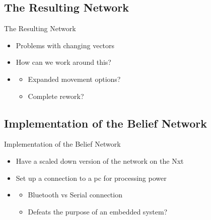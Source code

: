\subsection{The Resulting Network}
\begin{frame}{The Resulting Network}
\begin{itemize}
\item Problems with changing vectors
\item How can we work around this?
\item \begin{itemize}
  \item Expanded movement options?
  \item Complete rework?
  \end{itemize}
\end{itemize}
\end{frame}


\subsection{Implementation of the Belief Network}
\begin{frame}{Implementation of the Belief Network}
\begin{itemize}
\item Have a scaled down version of the network on the Nxt
\item Set up a connection to a pc for processing power
\item \begin{itemize}
   \item Bluetooth vs Serial connection
   \item Defeats the purpose of an embedded system?
   \end{itemize}
\end{itemize}
\end{frame}

